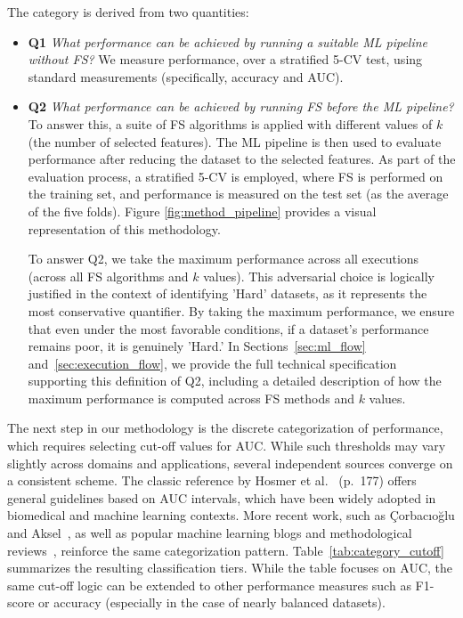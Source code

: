 \documentclass[preprint,12pt,authoryear]{elsarticle}
\begin{document}
The category is derived from two quantities:
\begin{itemize}
    \item{\bf{Q1}} \emph{ What performance can be achieved by running a suitable ML pipeline without FS?} We measure performance, over a stratified 5-CV test, using standard measurements (specifically, accuracy and AUC). 
    
    \item{\bf{Q2}} \emph{What performance can be achieved by running FS before the ML pipeline?}  
    To answer this, a suite of FS algorithms is applied with different values of \(k\) (the number of selected features). The ML pipeline is then used to evaluate performance after reducing the dataset to the selected features. As part of the evaluation process, a stratified 5-CV is employed, where FS is performed on the training set, and performance is measured on the test set (as the average of the five folds). Figure \ref{fig:method_pipeline} provides a visual representation of this methodology.

    To answer Q2, we take the maximum performance across all executions (across all FS algorithms and \(k\) values). This adversarial choice is logically justified in the context of identifying 'Hard' datasets, as it represents the most conservative quantifier. By taking the maximum performance, we ensure that even under the most favorable conditions, if a dataset's performance remains poor, it is genuinely 'Hard.'   In Sections~\ref{sec:ml_flow} and~\ref{sec:execution_flow}, we provide the full technical specification supporting this definition of Q2, including a detailed description of how the maximum performance is computed across FS methods and $k$ values.

\end{itemize}



\vspace{2.5mm}



The next step in our methodology is the discrete categorization of performance, which requires selecting cut-off values for AUC. While such thresholds may vary slightly across domains and applications, several independent sources converge on a consistent scheme. The classic reference by Hosmer et al.~\cite{hosmer2013applied} (p.~177) offers general guidelines based on AUC intervals, which have been widely adopted in biomedical and machine learning contexts. More recent work, such as Çorbacıoğlu and Aksel~\cite{corbacioglu2023roc}, as well as popular machine learning blogs and methodological reviews~\cite{Jim_nez_Valverde_2011,lavazza2023reliability}, reinforce the same categorization pattern. Table~\ref{tab:category_cutoff} summarizes the resulting classification tiers. While the table focuses on AUC, the same cut-off logic can be extended to other performance measures such as F1-score or accuracy (especially in the case of nearly balanced datasets).
\end{document}
